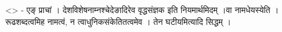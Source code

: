 \textless{}\textgreater{} - एङ् प्राचां । देशविशेषनाम्नश्चेदेङादिरेव
वृद्धसंज्ञक इति नियमार्थमिदम् ।वा नामधेयस्येति । रूढशब्दत्वमिह नामत्वं,
न त्वाधुनिकसंकेतितत्वमेव । तेन घटीयमित्यादि सिद्धम् ।

